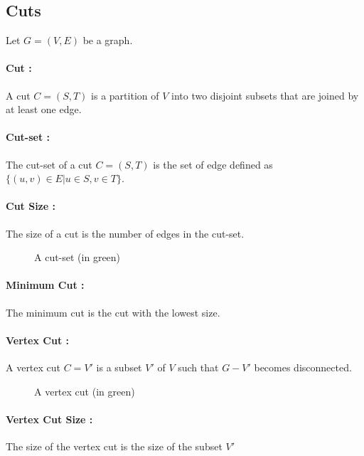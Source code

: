 \subsection{Cuts}
Let $G=(V,E)$ be a graph.
\paragraph{Cut :}
A cut $C=(S,T)$ is a partition of $V$ into two disjoint subsets that are joined by at least one edge.

\paragraph{Cut-set :}
The cut-set of a cut $C=(S,T)$ is the set of edge defined as $\{(u,v)\in E | u\in S, v \in T\}$.

\paragraph{Cut Size :}
The size of a cut is the number of edges in the cut-set.

\begin{figure}[!h]
  \begin{center}
    
  \end{center}
  \caption{A cut-set (in green)}
\end{figure}

\paragraph{Minimum Cut :} 
The minimum cut is the cut with the lowest size. 

\paragraph{Vertex Cut :}
A vertex cut $C=V'$ is a subset $V'$ of $V$ such that $G-V'$ becomes
disconnected.

\begin{figure}[!h]
  \begin{center}
    
  \end{center}
  \caption{A vertex cut (in green)}
\end{figure}


\paragraph{Vertex Cut Size :}
The size of the  vertex cut is the size of the subset $V'$

